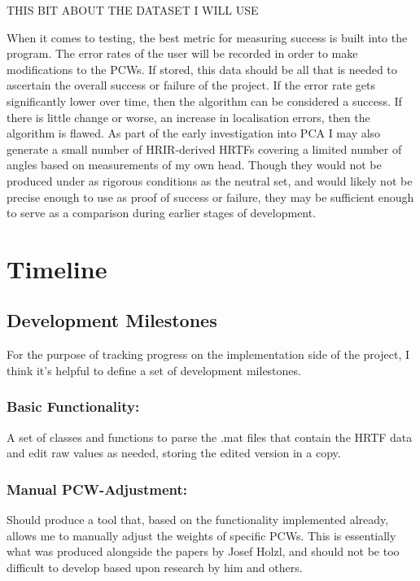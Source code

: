 \documentclass[10pt, oneside, a4paper, draft]{scrartcl}
\begin{document}
THIS BIT ABOUT THE DATASET I WILL USE

When it comes to testing, the best metric for measuring success is built into the program. The error rates of the user will be recorded in order to make modifications to the PCWs. If stored, this data should be all that is needed to ascertain the overall success or failure of the project. If the error rate gets significantly lower over time, then the algorithm can be considered a success. If there is little change or worse, an increase in localisation errors, then the algorithm is flawed. As part of the early investigation into PCA I may also generate a small number of HRIR-derived HRTFs covering a limited number of angles based on measurements of my own head. Though they would not be produced under as rigorous conditions as the neutral set, and would likely not be precise enough to use as proof of success or failure, they may be sufficient enough to serve as a comparison during earlier stages of development. 

\section*{Timeline}

\subsection*{Development Milestones}

For the purpose of tracking progress on the implementation side of the project, I think it's helpful to define a set of development milestones. 


\subsubsection*{Basic Functionality:}

A set of classes and functions to parse the .mat files that contain the HRTF data and edit raw values as needed, storing the edited version in a copy. 

\subsubsection*{Manual PCW-Adjustment:}

Should produce a tool that, based on the functionality implemented already, allows me to manually adjust the weights of specific PCWs. This is essentially what was produced alongside the papers by Josef Holzl\cite{Holzl2014a}, and should not be too difficult to develop based upon research by him and others. 
\end{document}
